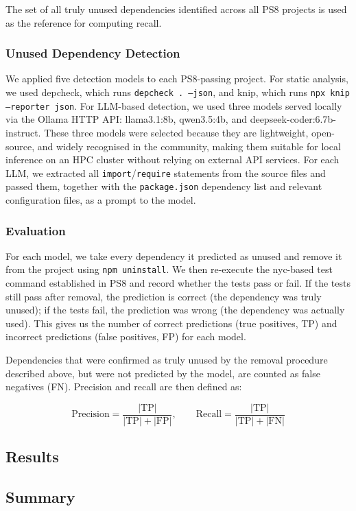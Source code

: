 \noindent The set of all truly unused dependencies identified across all
PS8 projects is used as the reference for computing recall.

\subsubsection{Unused Dependency Detection}

We applied five detection models to each PS8-passing project.
For static analysis, we used depcheck, which runs \texttt{depcheck . --json},
and knip, which runs \texttt{npx knip --reporter json}.
For LLM-based detection, we used three models served locally via
the Ollama HTTP API: llama3.1:8b, qwen3.5:4b, and
deepseek-coder:6.7b-instruct.
These three models were selected because they are lightweight,
open-source, and widely recognised in the community,
making them suitable for local inference on an HPC cluster without
relying on external API services.
For each LLM, we extracted all \texttt{import}/\texttt{require}
statements from the source files and passed them, together with the
\texttt{package.json} dependency list and relevant configuration files,
as a prompt to the model.

\subsubsection{Evaluation}

For each model, we take every dependency it predicted as unused and
remove it from the project using \texttt{npm uninstall}.
We then re-execute the nyc-based test command established in PS8 and
record whether the tests pass or fail.
If the tests still pass after removal, the prediction is correct
(the dependency was truly unused); if the tests fail, the prediction
was wrong (the dependency was actually used).
This gives us the number of correct predictions (true positives, TP)
and incorrect predictions (false positives, FP) for each model.

Dependencies that were confirmed as truly unused by the removal procedure
described above, but were not predicted by the model, are counted as
false negatives (FN).
Precision and recall are then defined as:

\begin{equation}
  \text{Precision} = \frac{|\mathrm{TP}|}{|\mathrm{TP}| + |\mathrm{FP}|},
  \qquad
  \text{Recall} = \frac{|\mathrm{TP}|}{|\mathrm{TP}| + |\mathrm{FN}|}
\end{equation}

\subsection{Results}

\subsection{Summary}
